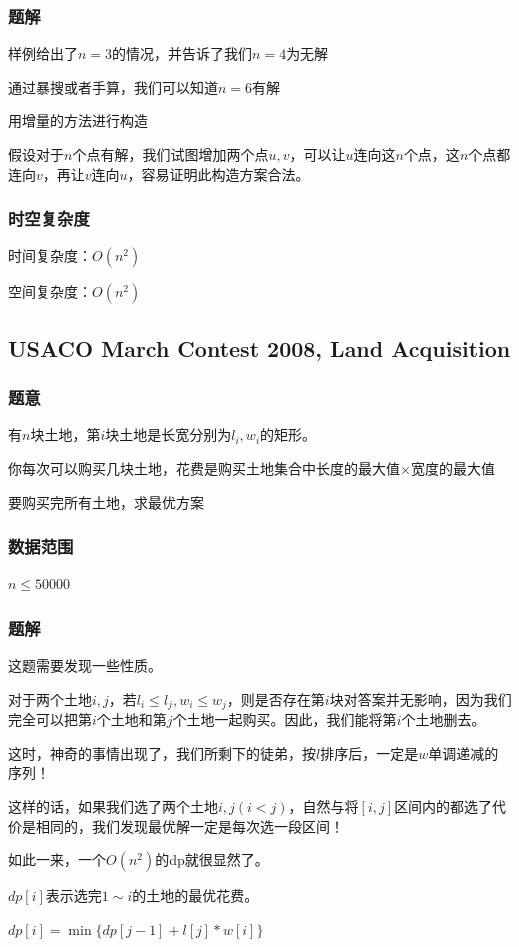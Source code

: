 \documentclass{ctexart}
\begin{document}
\subsubsection{题解}
样例给出了$n=3$的情况，并告诉了我们$n=4$为无解

通过暴搜或者手算，我们可以知道$n=6$有解

用增量的方法进行构造

假设对于$n$个点有解，我们试图增加两个点$u,v$，可以让$u$连向这$n$个点，这$n$个点都连向$v$，再让$v$连向$u$，容易证明此构造方案合法。
\subsubsection{时空复杂度}
时间复杂度：$O(n^2)$

空间复杂度：$O(n^2)$
\subsection{USACO March Contest 2008, Land Acquisition}
\subsubsection{题意}
有$n$块土地，第$i$块土地是长宽分别为$l_i,w_i$的矩形。

你每次可以购买几块土地，花费是购买土地集合中长度的最大值$\times$宽度的最大值

要购买完所有土地，求最优方案
\subsubsection{数据范围}
$n \le 50000$
\subsubsection{题解}
这题需要发现一些性质。

对于两个土地$i,j$，若$l_i \le l_j,w_i \le w_j$，则是否存在第$i$块对答案并无影响，因为我们完全可以把第$i$个土地和第$j$个土地一起购买。因此，我们能将第$i$个土地删去。

这时，神奇的事情出现了，我们所剩下的徒弟，按$l$排序后，一定是$w$单调递减的序列！

这样的话，如果我们选了两个土地$i,j(i<j)$，自然与将$[i,j]$区间内的都选了代价是相同的，我们发现最优解一定是每次选一段区间！

如此一来，一个$O(n^2)$的dp就很显然了。

$dp[i]$表示选完$1 \sim i$的土地的最优花费。

$dp[i]=\min\{dp[j-1]+l[j]*w[i]\}$
\end{document}
